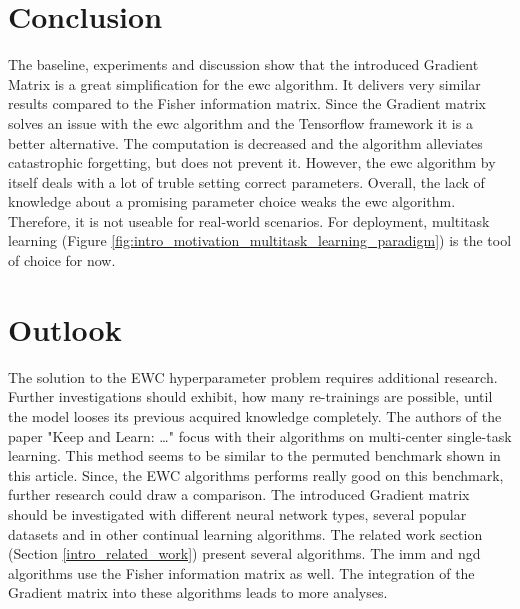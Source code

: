 \section{Conclusion}

The baseline, experiments and discussion show that the introduced Gradient Matrix is a great simplification for the \acrshort{ewc} algorithm.
It delivers very similar results compared to the Fisher information matrix.
Since the Gradient matrix solves an issue with the \acrshort{ewc} algorithm and the Tensorflow framework it is a better alternative.
The computation is decreased and the algorithm alleviates catastrophic forgetting, but does not prevent it.
However, the \acrshort{ewc} algorithm by itself deals with a lot of truble setting correct parameters.
Overall, the lack of knowledge about a promising parameter choice weaks the \acrshort{ewc} algorithm.
Therefore, it is not useable for real-world scenarios.
For deployment, multitask learning (Figure \ref{fig:intro_motivation_multitask_learning_paradigm}) is the tool of choice for now.

\section{Outlook}

The solution to the EWC hyperparameter problem requires additional research.
Further investigations should exhibit, how many re-trainings are possible, until the model looses its previous acquired knowledge completely.
\newline
The authors of the paper "Keep and Learn: …" \cite{Keep_and_Learn} focus with their algorithms on multi-center single-task learning.
This method seems to be similar to the permuted benchmark shown in this article.
Since, the EWC algorithms performs really good on this benchmark, further research could draw a comparison.
\newline
The introduced Gradient matrix should be investigated with different neural network types, several popular datasets and in other continual learning algorithms.
The related work section (Section \ref{intro_related_work}) present several algorithms.
The \acrshort{imm} and \acrshort{ngd} algorithms use the Fisher information matrix as well.
The integration of the Gradient matrix into these algorithms leads to more analyses.
